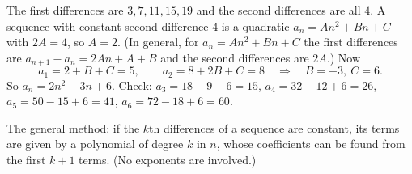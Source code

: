 The first differences are $3,7,11,15,19$ and the second differences are all $4$. A sequence with constant second difference $4$ is a quadratic $a_n=An^2+Bn+C$ with $2A=4$, so $A=2$. (In general, for $a_n=An^2+Bn+C$ the first differences are $a_{n+1}-a_n=2An+A+B$ and the second differences are $2A$.) Now
\[
a_1=2+B+C=5,\qquad a_2=8+2B+C=8\quad\Longrightarrow\quad B=-3,\ C=6 .
\]
So $\boxed{a_n=2n^2-3n+6}$. Check: $a_3=18-9+6=15$, $a_4=32-12+6=26$, $a_5=50-15+6=41$, $a_6=72-18+6=60$.

The general method: if the $k$th differences of a sequence are constant, its terms are given by a polynomial of degree $k$ in $n$, whose coefficients can be found from the first $k+1$ terms. (No exponents are involved.)
